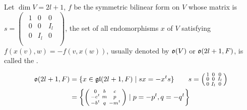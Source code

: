 \begin{exam}[$B_l$]
  Let $\dim V=2l+1$, $f$ be the symmetric bilinear form on $V$ whose matrix is $s=\begin{pmatrix}
                                                                                    \begin{smallmatrix}
                                                                                    1 & 0 & 0 \\
                                                                                    0 & 0 & I_l \\
                                                                                    0 & I_l & 0 \\
                                                                                    \end{smallmatrix}
                                                                                  \end{pmatrix}
  $, the set of all endomorphisms $x$ of $V$ satisfying $f(x(v),w)=-f(v,x(w))$, usually denoted by $\mathfrak{o}(V)$ or $\mathfrak{o}(2l+1,F)$, is called the .

  \begin{align*}
    \mathfrak{o}(2l+1,F)&=\{x\in \mathfrak{g}\mathfrak{l}(2l+1,F)\mid sx=-x^ts \}\qquad s=\begin{pmatrix}
                                                                                    \begin{smallmatrix}
                                                                                    1 & 0 & 0 \\
                                                                                    0 & 0 & I_l \\
                                                                                    0 & I_l & 0 \\
                                                                                    \end{smallmatrix}
                                                                                  \end{pmatrix}
                                                             \\
    &=\left\{ \begin{pmatrix}
           \begin{smallmatrix}
           0 & b & c \\
           -c^t & m &p \\
           -b^t & q & -m^t \\
           \end{smallmatrix}
         \end{pmatrix}
         \mid p=-p^t,q=-q^t
     \right\}
  \end{align*}


\end{exam}
